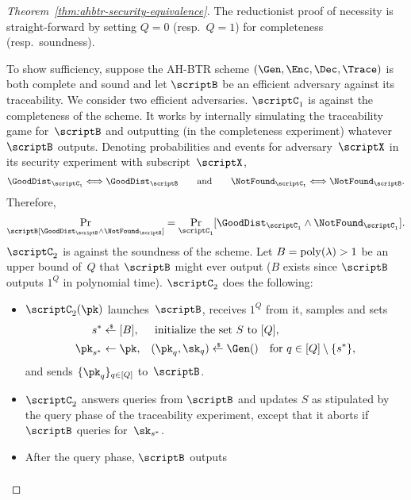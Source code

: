 \begin{proof}
[%
Theorem~\ref{thm:ahbtr-security-equivalence}]
The reductionist proof of necessity is straight-forward by setting ${Q=0}$ (resp.~${Q=1}$) for completeness (resp.~soundness).

To show sufficiency, suppose the AH-BTR scheme $(\Gen,\Enc,\Dec,\Trace)$ is both complete and sound and let $\scriptB$ be an efficient adversary against its traceability.
We consider two efficient adversaries.
$\scriptC_1$ is against the completeness of the scheme.
It works by internally simulating the traceability game for~$\scriptB$ and outputting (in the completeness experiment) whatever $\scriptB$ outputs.
Denoting probabilities and events for adversary~$\scriptX$ in its security experiment with subscript~$\scriptX$,
\begin{align*}
\GoodDist_{\scriptC_1}
\Longleftrightarrow
\GoodDist_\scriptB
\qquad\textup{and}\qquad
\NotFound_{\scriptC_1}
\Longleftrightarrow
\NotFound_\scriptB.
\end{align*}
Therefore,
\begin{align*}
\Pr_\scriptB[\GoodDist_\scriptB\wedge\NotFound_\scriptB]
=
\Pr_{\scriptC_1}
[\GoodDist_{\scriptC_1}\wedge\NotFound_{\scriptC_1}].
\end{align*}
$\scriptC_2$ is against the soundness of the scheme.
Let ${B=\operatorname{poly}(\lambda)>1}$ be an upper bound of~$Q$ that $\scriptB$ might ever output ($B$ exists since $\scriptB$ outputs $1^Q$ in polynomial time).
$\scriptC_2$ does the following:
\begin{itemize}
\item $\scriptC_2(\pk)$ launches~$\scriptB$, receives $1^Q$ from it,
samples and sets
\begin{align*}
s^\ast&{}\draws[B],&&
\textup{ initialize the set }S\textup{ to }[Q],\\
\pk_{s^\ast}&{}\gets\pk,&&
(\pk_q,\sk_q)\draws\Gen()\quad\textup{for }q\in{[Q]\setminus{\{s^\ast\}}},
\end{align*}
and sends $\{\pk_q\}_{q\in[Q]}$ to~$\scriptB$.
\item $\scriptC_2$ answers queries from $\scriptB$ and updates $S$ as stipulated by the query phase of the traceability experiment, except that it aborts if $\scriptB$ queries for~$\sk_{s^\ast}$.
\item After the query phase, $\scriptB$ outputs
\begin{align*}

\end{align*}
\end{itemize}
\end{proof}
